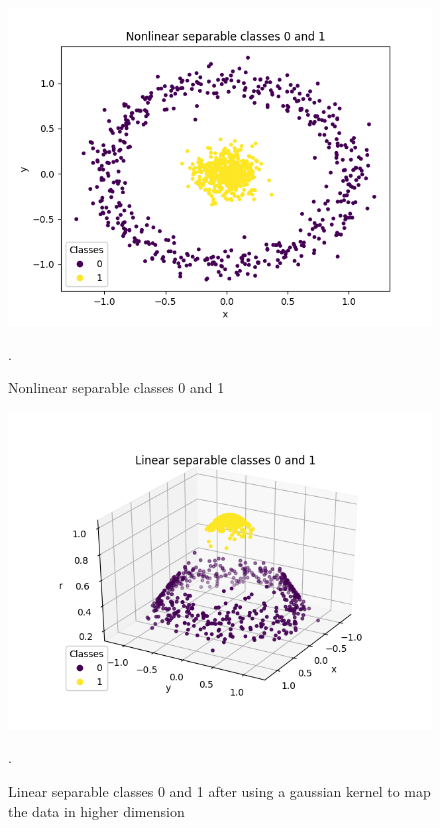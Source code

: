 \documentclass[../Main/thesis.tex]{subfiles}
\begin{document}
\begin{figure}[H] %
   \centering
   \includegraphics[width=6in]{../fig/nonlinearseparable.png} 
   \caption{Nonlinear separable classes 0 and 1}.
   \label{fig:kernelsvm}
\end{figure}

\begin{figure}[H] %
   \centering
   \includegraphics[width=6.5in]{../fig/linearseparable.png} 
   \caption{Linear separable classes 0 and 1 after using a gaussian kernel to map the data in higher dimension}.
   \label{fig:kernelsvm1}
\end{figure}
\end{document}
